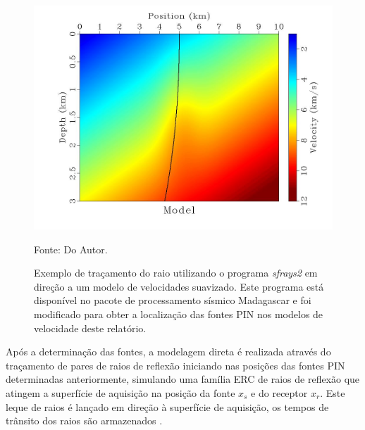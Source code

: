 \begin{figure}[H]
\caption{Exemplo de traçamento do raio utilizando o programa \textit{sfrays2}
em direção a um modelo de velocidades suavizado.
Este programa está disponível no pacote de processamento sísmico Madagascar e foi
modificado para obter a localização das fontes PIN nos modelos de velocidade deste relatório.}
\begin{center}
\includegraphics[scale=0.3]{images/raiomodelo.jpg}
\vspace{-0.3cm}
\end{center}
\begin{center}
 Fonte: Do Autor.
\end{center}
\label{fig:9.4}
\end{figure}

Após a determinação das fontes, a modelagem direta é realizada através do traçamento de pares de raios de reflexão
iniciando nas posições das fontes PIN determinadas anteriormente,
simulando uma família ERC de raios de reflexão que atingem a superfície de aquisição
na posição da fonte $x_s$ e do receptor $x_r$.
Este leque de raios é lançado em direção à superfície de aquisição,
os tempos de trânsito dos raios são armazenados \cite{stereo}.

